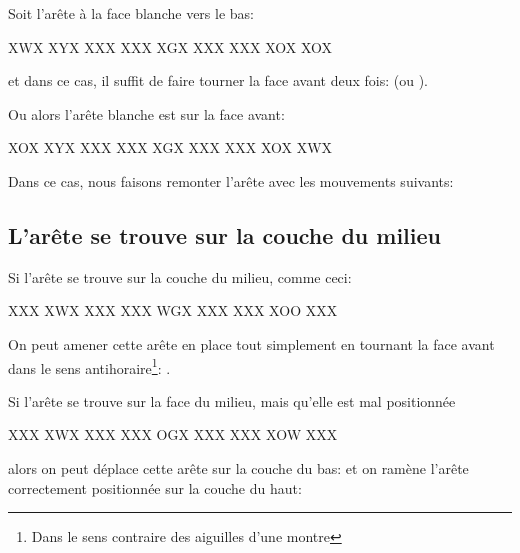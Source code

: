 Soit l'arête à la face blanche vers le bas:

\begin{center}
	\RubikFaceDown%
	{X}{W}{X}%
	{X}{Y}{X}%
	{X}{X}{X}
	\RubikFaceRight%
	{X}{X}{X}%
	{X}{G}{X}%
	{X}{X}{X}
	\RubikFaceFront%
	{X}{X}{X}%
	{X}{O}{X}%
	{X}{O}{X}
\end{center}

et dans ce cas, il suffit de faire tourner la face avant deux fois:  (ou ).

Ou alors l'arête blanche est sur la face avant:

\begin{center}
	\RubikFaceDown%
	{X}{O}{X}%
	{X}{Y}{X}%
	{X}{X}{X}
	\RubikFaceRight%
	{X}{X}{X}%
	{X}{G}{X}%
	{X}{X}{X}
	\RubikFaceFront%
	{X}{X}{X}%
	{X}{O}{X}%
	{X}{W}{X}
\end{center}

Dans ce cas, nous faisons remonter l'arête avec les mouvements suivants: 


\subsection{L'arête se trouve sur la couche du milieu}

Si l'arête se trouve sur la couche du milieu, comme ceci:

\begin{center}
	\RubikFaceUp%
	{X}{X}{X}%
	{X}{W}{X}%
	{X}{X}{X}
	\RubikFaceRight%
	{X}{X}{X}%
	{W}{G}{X}%
	{X}{X}{X}
	\RubikFaceFront%
	{X}{X}{X}%
	{X}{O}{O}%
	{X}{X}{X}
\end{center}

On peut amener cette arête en place tout simplement en tournant la face avant dans le sens antihoraire\footnote{Dans le sens contraire des aiguilles d'une montre}: .

Si l'arête se trouve sur la face du milieu, mais qu'elle est mal positionnée

\begin{center}
	\RubikFaceUp%
	{X}{X}{X}%
	{X}{W}{X}%
	{X}{X}{X}
	\RubikFaceRight%
	{X}{X}{X}%
	{O}{G}{X}%
	{X}{X}{X}
	\RubikFaceFront%
	{X}{X}{X}%
	{X}{O}{W}%
	{X}{X}{X}
\end{center}

alors on peut déplace cette arête sur la couche du bas:  et on ramène l'arête correctement positionnée sur la couche du haut: 


